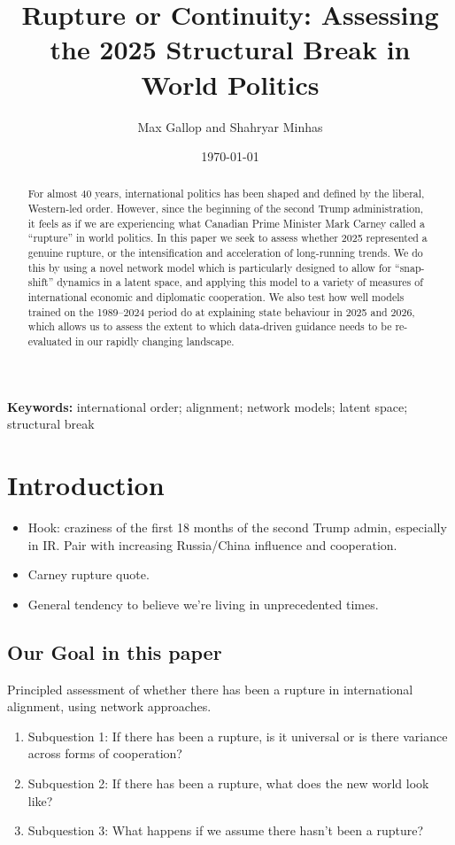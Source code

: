 \documentclass[12pt,a4paper]{article}
\title{Rupture or Continuity: Assessing the 2025 Structural Break in World Politics}
\author{Max Gallop and Shahryar Minhas} %
\date{\today}
\begin{document}
\maketitle

\begin{abstract}
\noindent For almost 40 years, international politics has been shaped and defined by the liberal, Western-led order. However, since the beginning of the second Trump administration, it feels as if we are experiencing what Canadian Prime Minister Mark Carney called a ``rupture'' in world politics. In this paper we seek to assess whether 2025 represented a genuine rupture, or the intensification and acceleration of long-running trends. We do this by using a novel network model which is particularly designed to allow for ``snap-shift'' dynamics in a latent space, and applying this model to a variety of measures of international economic and diplomatic cooperation. We also test how well models trained on the 1989--2024 period do at explaining state behaviour in 2025 and 2026, which allows us to assess the extent to which data-driven guidance needs to be re-evaluated in our rapidly changing landscape.
\end{abstract}

\bigskip
\noindent \textbf{Keywords:} international order; alignment; network models; latent space; structural break

\clearpage

\section{Introduction}
\begin{itemize}
\item Hook: craziness of the first 18 months of the second Trump admin, especially in IR. Pair with increasing Russia/China influence and cooperation.
\item Carney rupture quote.
\item General tendency to believe we're living in unprecedented times.
\end{itemize}

\subsection{Our Goal in this paper}

Principled assessment of whether there has been a rupture in international alignment, using network approaches.

\begin{enumerate}
\item Subquestion 1: If there has been a rupture, is it universal or is there variance across forms of cooperation?
\item Subquestion 2: If there has been a rupture, what does the new world look like?
\item Subquestion 3: What happens if we assume there hasn't been a rupture?
\end{enumerate}
\end{document}
